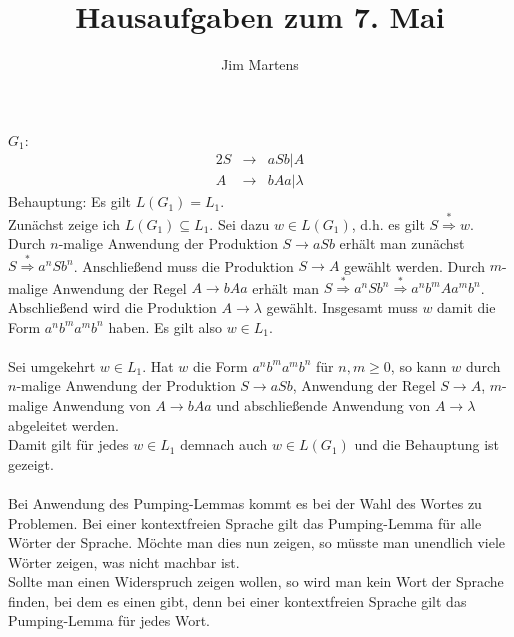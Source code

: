 \documentclass[10pt,a4paper,oneside,ngerman,numbers=noenddot]{scrartcl}
\begin{document}
\author{Jim Martens}
\title{Hausaufgaben zum 7. Mai}
\maketitle
\section{} %
\subsection{} %
$G_{1}$:\\
\begin{alignat*}{2}
S &\rightarrow & aSb | A \\
A &\rightarrow & bAa | \lambda
\end{alignat*}
Behauptung: Es gilt $L(G_{1}) = L_{1}$.\\
Zunächst zeige ich $L(G_{1}) \subseteq L_{1}$. Sei dazu $w \in L(G_{1})$, d.h. es gilt $S \overset{*}{\Longrightarrow} w$. Durch $n$-malige Anwendung der Produktion $S \rightarrow aSb$ erhält man zunächst $S \overset{*}{\Longrightarrow} a^{n}Sb^{n}$. Anschließend muss die Produktion $S \rightarrow A$ gewählt werden. Durch $m$-malige Anwendung der Regel $A \rightarrow bAa$ erhält man $S \overset{*}{\Longrightarrow} a^{n}Sb^{n} \overset{*}{\Longrightarrow} a^{n}b^{m}Aa^{m}b^{n}$. Abschließend wird die Produktion $A \rightarrow \lambda$ gewählt. Insgesamt muss $w$ damit die Form $a^{n}b^{m}a^{m}b^{n}$ haben. Es gilt also $w \in L_{1}$.\\
\\
Sei umgekehrt $w \in L_{1}$. Hat $w$ die Form $a^{n}b^{m}a^{m}b^{n}$ für $n,m \geq 0$, so kann $w$ durch $n$-malige Anwendung der Produktion $S \rightarrow aSb$, Anwendung der Regel $S \rightarrow A$, $m$-malige Anwendung von $A \rightarrow bAa$ und abschließende Anwendung von $A \rightarrow \lambda$ abgeleitet werden.\\
Damit gilt für jedes $w \in L_{1}$ demnach auch $w \in L(G_{1})$ und die Behauptung ist gezeigt.\\
\\
Bei Anwendung des Pumping-Lemmas kommt es bei der Wahl des Wortes zu Problemen. Bei einer kontextfreien Sprache gilt das Pumping-Lemma für alle Wörter der Sprache. Möchte man dies nun zeigen, so müsste man unendlich viele Wörter zeigen, was nicht machbar ist.\\
Sollte man einen Widerspruch zeigen wollen, so wird man kein Wort der Sprache finden, bei dem es einen gibt, denn bei einer kontextfreien Sprache gilt das Pumping-Lemma für jedes Wort.
\end{document}
